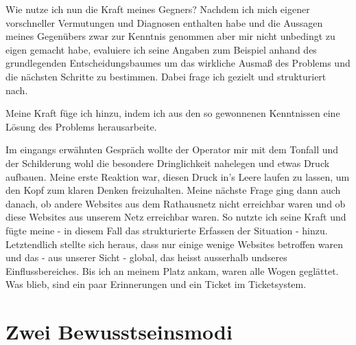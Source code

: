 \begin{normaltext}
Wie nutze ich nun die Kraft meines Gegners? Nachdem ich mich eigener
vorschneller Vermutungen und Diagnosen enthalten habe und die Aussagen meines
Gegenübers zwar zur Kenntnis genommen aber mir nicht unbedingt zu eigen
gemacht habe, evaluiere ich seine Angaben zum Beispiel anhand des
grundlegenden Entscheidungsbaumes um das wirkliche Ausmaß des Problems und die
nächsten Schritte zu bestimmen. Dabei frage ich gezielt und strukturiert nach.

Meine Kraft füge ich hinzu, indem ich aus den so gewonnenen Kenntnissen eine
Lösung des Problems herausarbeite.

Im eingangs erwähnten Gespräch wollte der Operator mir mit dem Tonfall und der
Schilderung wohl die besondere Dringlichkeit nahelegen und etwas Druck
aufbauen. Meine erste Reaktion war, diesen Druck in's Leere laufen zu lassen,
um den Kopf zum klaren Denken freizuhalten. Meine nächste Frage ging dann auch
danach, ob andere Websites aus dem Rathausnetz nicht erreichbar waren und ob
diese Websites aus unserem Netz erreichbar waren. So nutzte ich seine Kraft
und fügte meine - in diesem Fall das strukturierte Erfassen der Situation -
hinzu. Letztendlich stellte sich heraus, dass nur einige wenige Websites
betroffen waren und das - aus unserer Sicht - global, das heisst ausserhalb
undseres Einflussbereiches. Bis ich an meinem Platz ankam, waren alle Wogen
geglättet. Was blieb, sind ein paar Erinnerungen und ein Ticket im
Ticketsystem.
\end{normaltext}

\section{Zwei Bewusstseinsmodi}
\label{sec:zwei-bewusstseinsmodi}

